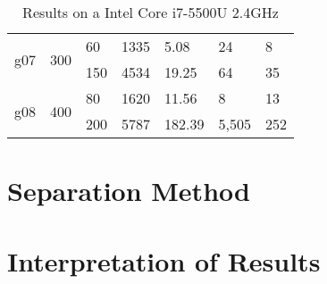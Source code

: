 \documentclass{article}
\begin{document}
\begin{table}[h!]
\begin{tabular}{l|l|l|l|l|l|l}
		\multirow{2}{*}{g07}& \multirow{2}{*}{300} 	& 60         	& 1335               & 5.08                       & 24         & 8                           \\
							&                   	& 150        	& 4534               & 19.25                      & 64         & 35                          \\ \hline
		\multirow{2}{*}{g08}& \multirow{2}{*}{400} 	& 80         	& 1620               & 11.56                      & 8        	& 13                           \\
							&                   	& 200        	& 5787               & 182.39                     & 5,505     & 252                            
	\end{tabular}
	\caption{Results on a Intel Core i7-5500U 2.4GHz}
\end{table}

\section{Separation Method}


\section{Interpretation of Results}
\end{document}
